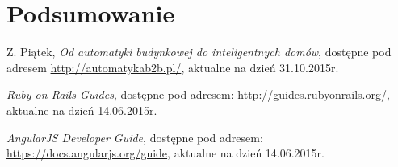 \documentclass[eng,oneside]{mgr}
\begin{document}
\chapter{Podsumowanie}

\begin{thebibliography}{inteligencja}

	Z. Piątek, \emph{Od automatyki budynkowej do inteligentnych domów}, dostępne pod adresem \url{http://automatykab2b.pl/}, aktualne na dzień 31.10.2015r.
	
	\emph{Ruby on Rails Guides}, dostępne pod adresem: \url{http://guides.rubyonrails.org/},\\ aktualne na dzień 14.06.2015r.
	
	\emph{AngularJS Developer Guide}, dostępne pod adresem: \url{https://docs.angularjs.org/guide}, aktualne na dzień 14.06.2015r.
	
\end{thebibliography}
\end{document}

